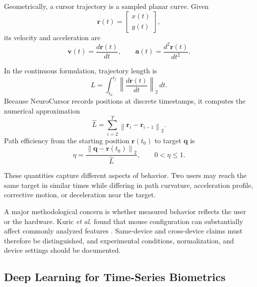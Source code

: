 \documentclass[conference]{IEEEtran}
\begin{document}
Geometrically, a cursor trajectory is a sampled planar curve. Given
\begin{equation}
\mathbf{r}(t)
=
\begin{bmatrix}
x(t)\\
y(t)
\end{bmatrix},
\label{eq:cursor_position}
\end{equation}
its velocity and acceleration are
\begin{equation}
\mathbf{v}(t)
=
\frac{d\mathbf{r}(t)}{dt},
\qquad
\mathbf{a}(t)
=
\frac{d^2\mathbf{r}(t)}{dt^2}.
\label{eq:velocity_acceleration}
\end{equation}

In the continuous formulation, trajectory length is
\begin{equation}
L
=
\int_{t_0}^{t_f}
\left\|
\frac{d\mathbf{r}(t)}{dt}
\right\|_2
\,dt.
\label{eq:continuous_path_length}
\end{equation}
Because NeuroCursor records positions at discrete timestamps, it computes
the numerical approximation
\begin{equation}
\widehat{L}
=
\sum_{i=2}^{T}
\left\|
\mathbf{r}_i-\mathbf{r}_{i-1}
\right\|_2.
\label{eq:discrete_path_length}
\end{equation}
Path efficiency from the starting position $\mathbf{r}(t_0)$ to target
$\mathbf{q}$ is
\begin{equation}
\eta
=
\frac{
\left\|
\mathbf{q}-\mathbf{r}(t_0)
\right\|_2
}{
\widehat{L}
},
\qquad
0 < \eta \leq 1.
\label{eq:path_efficiency}
\end{equation}

These quantities capture different aspects of behavior. Two users may reach
the same target in similar times while differing in path curvature,
acceleration profile, corrective motion, or deceleration near the target.

A major methodological concern is whether measured behavior reflects the
user or the hardware. Kuric \textit{et al.} found that mouse configuration
can substantially affect commonly analyzed features
\cite{kuricMouseCredibility}. Same-device and cross-device claims must
therefore be distinguished, and experimental conditions, normalization, and
device settings should be documented.

\subsection{Deep Learning for Time-Series Biometrics}
\end{document}
